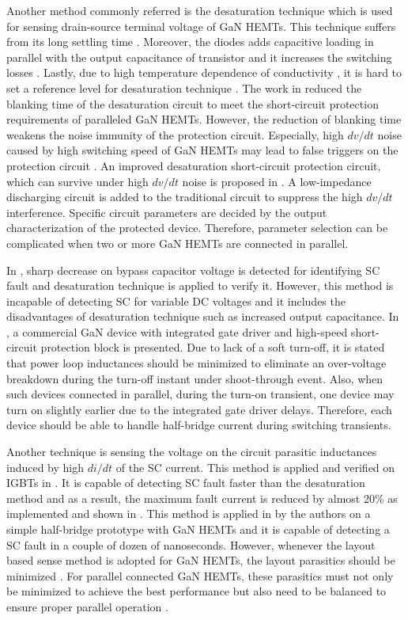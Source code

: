 \documentclass[journal]{IEEEtran}
\begin{document}
Another method commonly referred is the desaturation technique which is used for sensing drain-source terminal voltage of GaN HEMTs. This technique suffers from its long settling time \cite{Jones2017,Acuna, Wang2019, Hou2018a}. Moreover, the diodes adds capacitive loading in parallel with the output capacitance of transistor and it increases the switching losses \cite{Jones2017}. Lastly, due to high temperature dependence of conductivity \cite{Mishemts2017}, it is hard to set a reference level for desaturation technique \cite{Sun2018a}. The work in \cite{Gui2018} reduced the blanking time of the desaturation circuit to meet the short-circuit protection requirements of paralleled GaN HEMTs. However, the reduction of blanking time weakens the noise immunity of the protection circuit. Especially, high $dv/dt$ noise caused by high switching speed of GaN HEMTs may lead to false triggers on the protection circuit \cite{Wu2020}. An improved desaturation short-circuit protection circuit, which can survive under high $dv/dt$ noise is proposed in \cite{Wu2020}. A low-impedance discharging circuit is added to the traditional circuit to suppress the high $dv/dt$ interference. Specific circuit parameters are decided by the output characterization of the protected device. Therefore, parameter selection can be complicated when two or more GaN HEMTs are connected in parallel.

In \cite{Lyu2020}, sharp decrease on bypass capacitor voltage is detected for identifying SC fault and desaturation technique is applied to verify it. However, this method is incapable of detecting SC for variable DC voltages and it includes the disadvantages of desaturation technique such as increased output capacitance. In \cite{Dusmez2018}, a commercial GaN device with integrated gate driver and high-speed short-circuit protection block is presented. Due to lack of a soft turn-off, it is stated that power loop inductances should be minimized to eliminate an over-voltage breakdown during the turn-off instant under shoot-through event. Also, when such devices connected in parallel, during the turn-on transient, one device may turn on slightly earlier due to the integrated gate driver delays. Therefore, each device should be able to handle half-bridge current during switching transients.

Another technique is sensing the voltage on the circuit parasitic inductances induced by high $di/dt$ of the SC current. This method is applied and verified on IGBTs in \cite{Oinonen2014}. It is capable of detecting SC fault faster than the desaturation method and as a result, the maximum fault current is reduced by almost 20\% as implemented and shown in \cite{Awwad}. This method is applied in \cite{Alemdar2019} by the authors on a simple half-bridge prototype with GaN HEMTs and it is capable of detecting a SC fault in a couple of dozen of nanoseconds. However, whenever the layout based sense method is adopted for GaN HEMTs, the layout parasitics should be minimized \cite{Hou2018a}. For parallel connected GaN HEMTs, these parasitics must not only be minimized to achieve the best performance but also need to be balanced to ensure proper parallel operation \cite{Reusch2016}.
\end{document}
